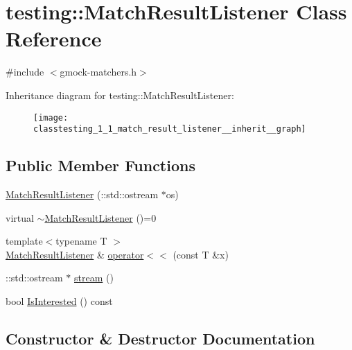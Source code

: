 \hypertarget{classtesting_1_1_match_result_listener}{}\section{testing\+:\+:Match\+Result\+Listener Class Reference}
\label{classtesting_1_1_match_result_listener}


{\ttfamily \#include $<$gmock-\/matchers.\+h$>$}



Inheritance diagram for testing\+:\+:Match\+Result\+Listener\+:
\nopagebreak
\begin{figure}[H]
\begin{center}
\leavevmode
\texttt{[image: classtesting\_1\_1\_match\_result\_listener\_\_inherit\_\_graph]}
\end{center}
\end{figure}
\subsection*{Public Member Functions}
\begin{DoxyCompactItemize}
\item 
\hyperlink{classtesting_1_1_match_result_listener_a245c360286cd0496d22a4d2fde80eb0b}{Match\+Result\+Listener} (\+::std\+::ostream $\ast$os)
\item 
virtual \hyperlink{classtesting_1_1_match_result_listener_aa29f43f7b2ffd850c721a8a33ccbba92}{$\sim$\+Match\+Result\+Listener} ()=0
\item 
{\footnotesize template$<$typename T $>$ }\\\hyperlink{classtesting_1_1_match_result_listener}{Match\+Result\+Listener} \& \hyperlink{classtesting_1_1_match_result_listener_a89f628a452635d1502a9062d9c864ebd}{operator$<$$<$} (const T \&x)
\item 
\+::std\+::ostream $\ast$ \hyperlink{classtesting_1_1_match_result_listener_a5abecb247e005f7f50a94898e3f44ee3}{stream} ()
\item 
bool \hyperlink{classtesting_1_1_match_result_listener_a68dc4f2f3c3425f4d4dd90ab02244615}{Is\+Interested} () const 
\end{DoxyCompactItemize}


\subsection{Constructor \& Destructor Documentation}
